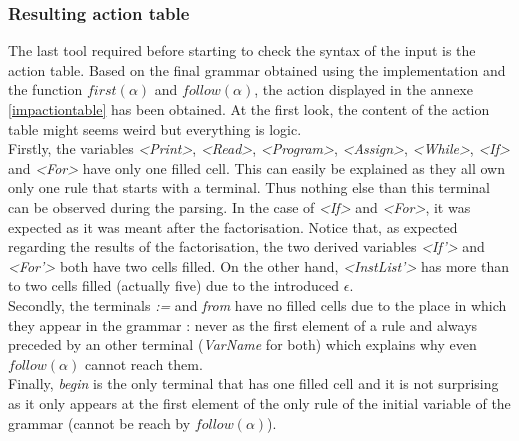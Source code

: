 \documentclass[a4paper,11pt]{article}
\begin{document}
    \subsubsection{Resulting action table}
      The last tool required before starting to check the syntax of the input is the action table. Based on the final grammar obtained using the implementation and the function $first(\alpha)$ and $follow(\alpha)$, the action displayed in the annexe \ref{impactiontable} has been obtained. At the first look, the content of the action table might seems weird but everything is logic.\\
      Firstly, the variables \textit{<Print>}, \textit{<Read>}, \textit{<Program>}, \textit{<Assign>}, \textit{<While>}, \textit{<If>} and \textit{<For>} have only one filled cell. This can easily be explained as they all own only one rule that starts with a terminal. Thus nothing else than this terminal can be observed during the parsing. In the case of \textit{<If>} and \textit{<For>}, it was expected as it was meant after the factorisation. Notice that, as expected regarding the results of the factorisation, the two derived variables \textit{<If'>} and \textit{<For'>} both have two cells filled. On the other hand, \textit{<InstList'>} has more than to two cells filled (actually five) due to the introduced $\epsilon$.\\
      Secondly, the terminals \textit{:=} and \textit{from} have no filled cells due to the place in which they appear in the grammar : never as the first element of a rule and always preceded by an other terminal (\textit{VarName} for both) which explains why even $follow(\alpha)$ cannot reach them.\\
      Finally, \textit{begin} is the only terminal that has one filled cell and it is not surprising as it only appears at the first element of the only rule of the initial variable of the grammar (cannot be reach by $follow(\alpha)$).
    
\end{document}

